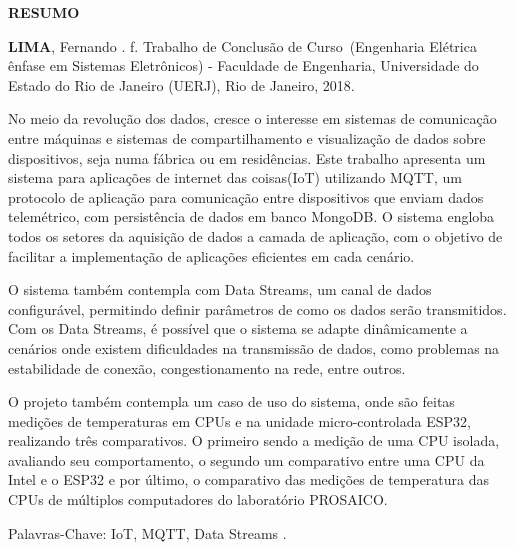\begin{center}
\textbf{RESUMO}
\end{center}

%
%


$\!$\\

\hspace{-1.3cm}\textbf{LIMA}, Fernando \textit{\setTitulo}. \pageref{LastPage} f. Trabalho de Conclusão de Curso~(Engenharia Elétrica ênfase em Sistemas Eletrônicos) - Faculdade de Engenharia, Universidade do Estado do Rio de Janeiro (UERJ), Rio de Janeiro, 2018.

\vspace{.2cm}

No meio da revolução dos dados, cresce o interesse em sistemas de comunicação entre máquinas e sistemas de compartilhamento e visualização de dados  sobre dispositivos, seja numa fábrica ou em residências. Este trabalho apresenta um sistema para aplicações de internet das coisas(IoT) utilizando MQTT, um protocolo de aplicação para comunicação entre dispositivos que enviam dados telemétrico, com persistência de dados em banco MongoDB. O sistema engloba todos os setores da aquisição de dados a camada de aplicação, com o objetivo de facilitar a implementação de aplicações eficientes em cada cenário.

O sistema também contempla com Data Streams, um canal de dados configurável, permitindo definir parâmetros de como os dados serão transmitidos. Com os Data Streams, é possível que o sistema se adapte dinâmicamente a cenários onde existem dificuldades na transmissão de dados, como problemas na estabilidade de conexão, congestionamento na rede, entre outros.

O projeto também contempla um caso de uso do sistema, onde são feitas medições de temperaturas em CPUs e na unidade micro-controlada ESP32, realizando três comparativos. O primeiro sendo a medição de uma CPU isolada, avaliando seu comportamento, o segundo um comparativo entre uma CPU da Intel e o ESP32 e por último, o comparativo das medições de temperatura das CPUs de múltiplos computadores do laboratório PROSAICO. 



\vspace{1cm}

\hspace{-1.3cm}Palavras-Chave: IoT, MQTT, Data Streams .
